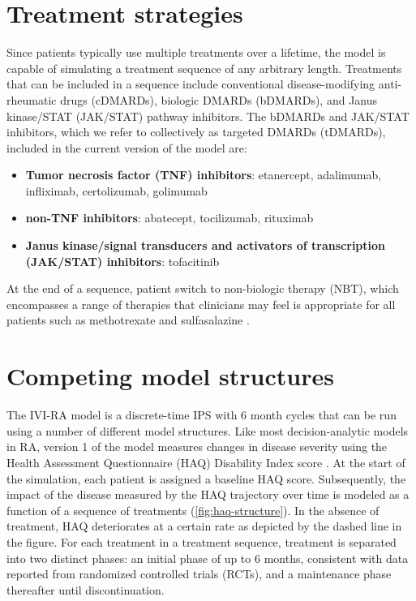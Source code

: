 \documentclass[11pt,final,fleqn]{article}\usepackage[]{graphicx}\usepackage[]{color}
\theoremstyle{plain}
\begin{document}
\section{Treatment strategies}\label{sec:treatments}
Since patients typically use multiple treatments over a lifetime, the model is capable of simulating a treatment sequence of any arbitrary length. Treatments that can be included in a sequence include conventional disease-modifying anti-rheumatic drugs (cDMARDs), biologic DMARDs (bDMARDs), and Janus kinase/STAT (JAK/STAT) pathway inhibitors. The bDMARDs and JAK/STAT inhibitors, which we refer to collectively as targeted DMARDs (tDMARDs), included in the current version of the model are:

\begin{itemize}
\item \textbf{Tumor necrosis factor (TNF) inhibitors}: etanercept, adalimumab, infliximab, certolizumab, golimumab
\item \textbf{non-TNF inhibitors}: abatecept, tocilizumab, rituximab
\item \textbf{Janus kinase/signal transducers and activators of transcription (JAK/STAT) inhibitors}: tofacitinib
\end{itemize}

At the end of a sequence, patient switch to non-biologic therapy (NBT), which encompasses a range of therapies that clinicians may feel is appropriate for all patients such as methotrexate and sulfasalazine \citep{stevenson2016adalimumab, stevenson2017cost}.

\section{Competing model structures}\label{sec:model-structures}
The IVI-RA model is a discrete-time IPS with 6 month cycles that can be run using a number of different model structures. Like most decision-analytic models in RA, version 1 of the model measures changes in disease severity using the Health Assessment Questionnaire (HAQ) Disability Index score \citep{brennan2003modelling, wailoo2008biologic, tosh2011sheffield, carlson2015economic, stephens2015modelling, athanasakis2015cost, stevenson2016adalimumab, icer2017tim, stevenson2017cost}. At the start of the simulation, each patient is assigned a baseline HAQ score. Subsequently, the impact of the disease measured by the HAQ trajectory over time is modeled as a function of a sequence of treatments (\autoref{fig:haq-structure}). In the absence of treatment, HAQ deteriorates at a certain rate as depicted by the dashed line in the figure. For each treatment in a treatment sequence, treatment is separated into two distinct phases: an initial phase of up to 6 months, consistent with data reported from randomized controlled trials (RCTs), and a maintenance phase thereafter until discontinuation. 
\end{document}
